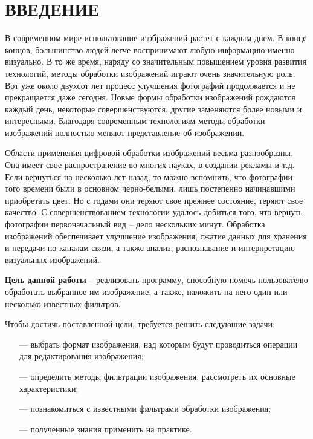 \section*{ВВЕДЕНИЕ}

В современном мире использование изображений растет с каждым днем. В конце концов, большинство людей легче воспринимают любую информацию именно визуально. В то же время, наряду со значительным повышением уровня развития технологий, методы обработки изображений играют очень значительную роль. 
Вот уже около двухсот лет процесс улучшения фотографий продолжается и не прекращается даже сегодня. Новые формы обработки изображений рождаются каждый день, некоторые совершенствуются, другие заменяются более новыми и интересными. Благодаря современным технологиям методы обработки изображений полностью меняют представление об изображении. 

Области применения цифровой обработки изображений весьма разнообразны. Она имеет свое распространение во многих науках, в создании рекламы и т.д.
Если вернуться на несколько лет назад, то можно вспомнить, что фотографии того времени были в основном черно-белыми, лишь постепенно начинавшими приобретать цвет. Но с годами они теряют свое прежнее состояние, теряют свое качество. С совершенствованием технологии удалось добиться того, что вернуть фотографии первоначальный вид -- дело нескольких минут.
Обработка изображений обеспечивает улучшение изображения, сжатие данных для хранения и передачи по каналам связи, а также анализ, распознавание и интерпретацию визуальных изображений.

\textbf{Цель данной работы} -- реализовать программу, способную помочь пользователю обработать выбранное им изображение, а также, наложить на него один или несколько известных фильтров.

Чтобы достичь поставленной цели, требуется решить следующие задачи:

\begin{itemize}[leftmargin=1.6\parindent]
	\item[---] выбрать формат изображения, над которым будут проводиться операции для редактирования изображения;
	\item[---] определить методы фильтрации изображения, рассмотреть их основные характеристики;
	\item[---] познакомиться с известными фильтрами обработки изображения;
	\item[---] полученные знания применить на практике.
\end{itemize}

\pagebreak